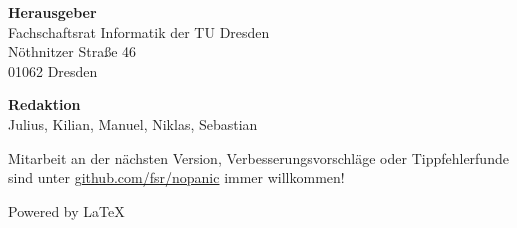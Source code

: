 \newpage
\thispagestyle{empty} %
\color{white}
\textbf{Herausgeber} \\
Fachschaftsrat Informatik der TU Dresden\\
Nöthnitzer Straße 46\\
01062 Dresden

\textbf{Redaktion} \\
Julius,
Kilian,
Manuel,
Niklas,
Sebastian

Mitarbeit an der nächsten Version, Verbesserungsvorschläge oder Tippfehlerfunde sind unter \url{github.com/fsr/nopanic} immer willkommen!

Powered by \LaTeX

\AddToShipoutPicture*{\BackcoverPic} %
